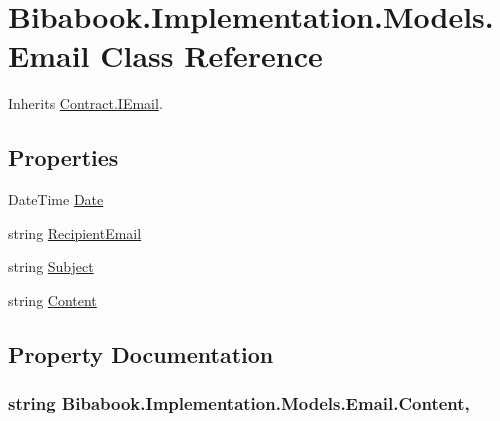 \hypertarget{class_bibabook_1_1_implementation_1_1_models_1_1_email}{}\section{Bibabook.\+Implementation.\+Models.\+Email Class Reference}
\label{class_bibabook_1_1_implementation_1_1_models_1_1_email}


Inherits \hyperlink{interface_contract_1_1_i_email}{Contract.\+I\+Email}.

\subsection*{Properties}
\begin{DoxyCompactItemize}
\item 
Date\+Time \hyperlink{class_bibabook_1_1_implementation_1_1_models_1_1_email_a84d1820e0a0ae9fce66e15df4546cf46}{Date}
\item 
string \hyperlink{class_bibabook_1_1_implementation_1_1_models_1_1_email_a1a8b55a0fa33dd44b9496e379858263d}{Recipient\+Email}
\item 
string \hyperlink{class_bibabook_1_1_implementation_1_1_models_1_1_email_addc43ff83003a1972d568fdac29f89bd}{Subject}
\item 
string \hyperlink{class_bibabook_1_1_implementation_1_1_models_1_1_email_a7810886176c92c1f9ff384640fead18e}{Content}
\end{DoxyCompactItemize}


\subsection{Property Documentation}
\hypertarget{class_bibabook_1_1_implementation_1_1_models_1_1_email_a7810886176c92c1f9ff384640fead18e}{}
\subsubsection[{Content}]{\setlength{\rightskip}{0pt plus 5cm}string Bibabook.\+Implementation.\+Models.\+Email.\+Content\hspace{0.3cm}{\ttfamily [get]}, {\ttfamily [set]}}\label{class_bibabook_1_1_implementation_1_1_models_1_1_email_a7810886176c92c1f9ff384640fead18e}
\hypertarget{class_bibabook_1_1_implementation_1_1_models_1_1_email_a84d1820e0a0ae9fce66e15df4546cf46}{}
